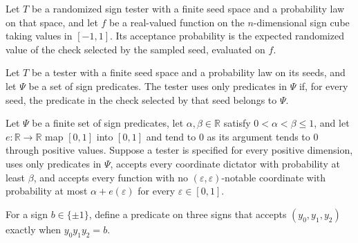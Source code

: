 \begin{definition}
\label{FABL.SignTester.acceptanceProbability}
\leanok
{}
Let $T$ be a randomized sign tester with a finite seed space and a probability law on
that space, and let $f$ be a real-valued function on the $n$-dimensional sign cube
taking values in $[-1,1]$. Its acceptance probability is the expected randomized value
of the check selected by the sampled seed, evaluated on $f$.
\end{definition}

\begin{definition}
\label{FABL.SignTester.UsesPredicates}
\leanok
{}
Let $T$ be a tester with a finite seed space and a probability law on its seeds, and let
$\Psi$ be a set of sign predicates. The tester uses only predicates in $\Psi$ if, for
every seed, the predicate in the check selected by that seed belongs to $\Psi$.
\end{definition}

\begin{definition}
\label{FABL.IsDictatorVsNoNotablesTest}
\leanok
{}
Let $\Psi$ be a finite set of sign predicates, let $\alpha,\beta\in\mathbb R$ satisfy
$0<\alpha<\beta\le1$, and let $e\colon\mathbb R\to\mathbb R$ map $[0,1]$ into $[0,1]$
and tend to $0$ as its argument tends to $0$ through positive values. Suppose a tester
is specified for every positive dimension, uses only predicates in $\Psi$, accepts every
coordinate dictator with probability at least $\beta$, and accepts every function with
no $(\varepsilon,\varepsilon)$-notable coordinate with probability at most
$\alpha+e(\varepsilon)$ for every $\varepsilon\in[0,1]$.
\end{definition}

\begin{definition}
\label{FABL.e3LinPredicate}
\leanok
{}
For a sign $b\in\{\pm1\}$, define a predicate on three signs that accepts
$(y_0,y_1,y_2)$ exactly when $y_0y_1y_2=b$.
\end{definition}

